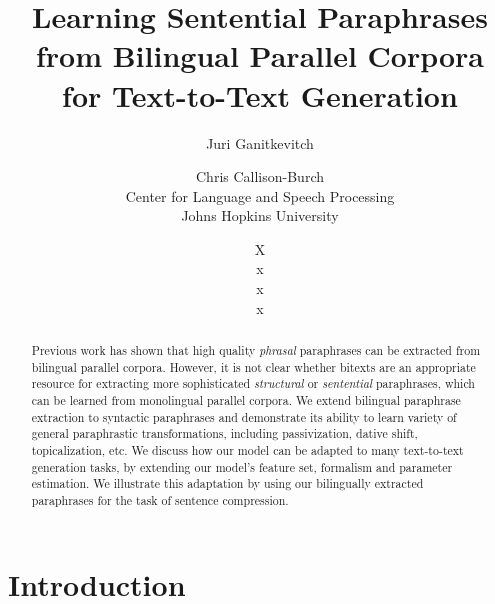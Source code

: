 \documentclass[11pt]{article}
\title{Learning Sentential Paraphrases from Bilingual Parallel Corpora \\ for Text-to-Text Generation}
\author{Juri Ganitkevitch \and Chris Callison-Burch\\ 
Center for Language and Speech Processing\\ 
Johns Hopkins University}
\author{X\\ 
x\\ 
x\\ 
x}
\date{}
\begin{document}
\maketitle

\begin{abstract}
Previous work has shown that high quality {\it phrasal} paraphrases can be extracted from  bilingual parallel corpora.  However, it is not clear whether bitexts are an appropriate resource for extracting more sophisticated {\it structural} or {\it sentential} paraphrases, which can be learned from monolingual parallel corpora.
We extend bilingual paraphrase extraction to syntactic paraphrases
and demonstrate its ability to learn variety of general paraphrastic transformations, 
including passivization, dative shift, topicalization, etc.  We discuss how our model can be adapted to many text-to-text generation tasks, by extending our model's feature set, formalism and parameter estimation.  We illustrate this adaptation by using our bilingually extracted paraphrases for the task of sentence compression. 
\end{abstract}

\section{Introduction} \label{introduction}
\end{document}
